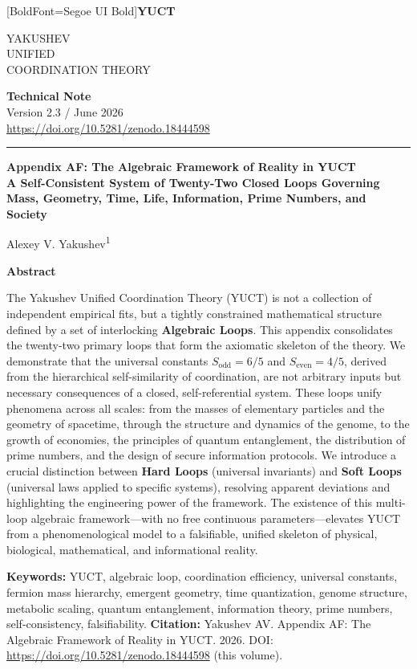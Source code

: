 \documentclass[12pt,a4paper]{article}
\newcommand{\makeheader}{%
	\noindent
	\begin{minipage}{0.17\textwidth}
		\raggedright
		{\fontspec{Segoe UI}[BoldFont=Segoe UI Bold]\bfseries\color{skyblue}\fontsize{46}{46}\selectfont YUCT}%
	\end{minipage}%
	\hspace{30pt}
	\begin{minipage}{0.32\textwidth}
		\raggedright
		{\sffamily\fontsize{11}{13}\selectfont YAKUSHEV\\ UNIFIED\\ COORDINATION THEORY}%
	\end{minipage}%
	\hfill
	\begin{minipage}{0.38\textwidth}
		\raggedleft
		{\sffamily\bfseries Technical Note}\\ 
		{\sffamily Version 2.3 / June 2026}\\ 
		{\sffamily\footnotesize \mbox{\url{https://doi.org/10.5281/zenodo.18444598}}}%
	\end{minipage}
	\par\vspace{5pt}
	\noindent\textcolor{gold}{\rule{\textwidth}{1.6pt}}
	\par\vspace{0pt}
}
\begin{document}
	
	\thispagestyle{firstpage}
	\makeheader
	
	\vspace{0cm}
	{\LARGE\bfseries Appendix AF: The Algebraic Framework of Reality in YUCT \\ 
		\Large A Self-Consistent System of Twenty-Two Closed Loops Governing Mass, Geometry, Time, Life, Information, Prime Numbers, and Society \par}
	\vspace{0.2cm}
	
	{\large Alexey V. Yakushev\textsuperscript{1}} \\
	\vspace{0.0cm}
	
	{\color{darkblue}\textbf{\LARGE Abstract}} \par
	{\large
		\noindent
		The Yakushev Unified Coordination Theory (YUCT) is not a collection of independent empirical fits, but a tightly constrained mathematical structure defined by a set of interlocking \textbf{Algebraic Loops}. This appendix consolidates the twenty-two primary loops that form the axiomatic skeleton of the theory. We demonstrate that the universal constants \(S_{\mathrm{odd}} = 6/5\) and \(S_{\mathrm{even}} = 4/5\), derived from the hierarchical self-similarity of coordination, are not arbitrary inputs but necessary consequences of a closed, self-referential system. These loops unify phenomena across all scales: from the masses of elementary particles and the geometry of spacetime, through the structure and dynamics of the genome, to the growth of economies, the principles of quantum entanglement, the distribution of prime numbers, and the design of secure information protocols. We introduce a crucial distinction between \textbf{Hard Loops} (universal invariants) and \textbf{Soft Loops} (universal laws applied to specific systems), resolving apparent deviations and highlighting the engineering power of the framework. The existence of this multi-loop algebraic framework—with no free continuous parameters—elevates YUCT from a phenomenological model to a falsifiable, unified skeleton of physical, biological, mathematical, and informational reality.}
	
	\vspace{0.1cm}
	\noindent
	{\color{darkblue}\textbf{Keywords:}} YUCT, algebraic loop, coordination efficiency, universal constants, fermion mass hierarchy, emergent geometry, time quantization, genome structure, metabolic scaling, quantum entanglement, information theory, prime numbers, self-consistency, falsifiability.
	\vspace{0.1cm}
	\noindent
	{\color{darkblue}\textbf{Citation:}} Yakushev AV. Appendix AF: The Algebraic Framework of Reality in YUCT. 2026. DOI: \url{https://doi.org/10.5281/zenodo.18444598} (this volume).
	
\end{document}
